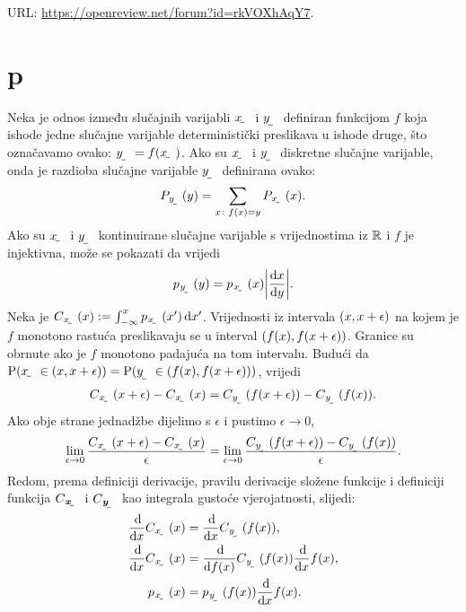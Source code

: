 \documentclass{article}
\begin{document}
URL: \url{https://openreview.net/forum?id=rkVOXhAqY7}.


\section{p}

Neka je odnos između slučajnih varijabli $\rvar x$ i $\rvar y$ definiran funkcijom $f$ koja ishode jedne slučajne varijable deterministički preslikava u ishode druge, što označavamo ovako: $\rvar y = f(\rvar x)$.  Ako su $\rvar x$ i $\rvar y$ diskretne slučajne varijable, onda je razdioba slučajne varijable $\rvar y$ definirana ovako:
\begin{align}
	P_{\rvar y}(y) = \sum_{x\colon f(x)=y} P_\rvar{x}(x) \text{.}
\end{align} 
Ako su $\rvar x$ i $\rvar y$ kontinuirane slučajne varijable s vrijednostima iz $\mathbb{R}$ i $f$ je injektivna, može se pokazati \citep{Elezovic:2007:VSSV} da vrijedi
\begin{align} \label{eq:gustoca-funkcije-sv}
p_{\rvar y}(y) = p_\rvar{x}(x) \envert{\od{x}{y}} \text{.}
\end{align} 
Neka je $C_{\rvar x}(x) := \int_{-\infty}^{x} p_{\rvar x}(x') \dif{x'}$. Vrijednosti iz intervala $\intoo{x, x+\epsilon}$ na kojem je $f$ monotono rastuća preslikavaju se u interval $\intoo{f(x), f(x+\epsilon)}$. Granice su obrnute ako je $f$ monotono padajuća na tom intervalu. Budući da $\P\del{\rvar x\in\intoo{x, x+\epsilon}}=\P\del{\rvar y\in\intoo{f(x), f(x+\epsilon)}}$, vrijedi
\begin{align}
C_{\rvar x}(x+\epsilon)-C_{\rvar x}(x) = 
C_{\rvar y}(f(x+\epsilon))-C_{\rvar y}(f(x)) \text{.}
\end{align}
Ako obje strane jednadžbe dijelimo s $\epsilon$ i pustimo $\epsilon\to0$, 
\begin{align}
	\lim_{\epsilon\to 0}\frac{C_{\rvar x}(x+\epsilon)-C_{\rvar x}(x)}{\epsilon} = \lim_{\epsilon\to 0}\frac{C_{\rvar y}(f(x+\epsilon))-C_{\rvar y}(f(x))}{\epsilon} \text{.}
\end{align}
Redom, prema definiciji derivacije, pravilu derivacije složene funkcije i definiciji funkcija $C_\rvec{x}$ i $C_\rvec{y}$ kao integrala gustoće vjerojatnosti, slijedi:
\begin{align}
\od{}{x}C_{\rvar x}(x) &= \od{}{x}C_{\rvar y}(f(x)) \text{,}\\
\od{}{x}C_{\rvar x}(x) &= \od{}{f(x)}C_{\rvar y}(f(x))\od{}{x}f(x) \text{,}\\
p_{\rvar x}(x) &= p_{\rvar y}(f(x))\od{}{x}f(x) \text{.} \label{eq:gustoca-funkcije-sv-dokaz-rastuci}
\end{align}
\end{document}
